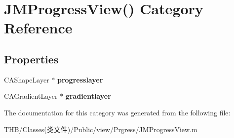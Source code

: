 \hypertarget{category_j_m_progress_view_07_08}{}\section{J\+M\+Progress\+View() Category Reference}
\label{category_j_m_progress_view_07_08}
\subsection*{Properties}
\begin{DoxyCompactItemize}
\item 
\mbox{\label{category_j_m_progress_view_07_08_ac23541a9fccaba55716b30b03fb4707a}} 
C\+A\+Shape\+Layer $\ast$ {\bfseries progresslayer}
\item 
\mbox{\label{category_j_m_progress_view_07_08_a1dac9503af405a5aa1bd5e360c5f707b}} 
C\+A\+Gradient\+Layer $\ast$ {\bfseries gradientlayer}
\end{DoxyCompactItemize}


The documentation for this category was generated from the following file\+:\begin{DoxyCompactItemize}
\item 
T\+H\+B/\+Classes(类文件)/\+Public/view/\+Prgress/J\+M\+Progress\+View.\+m\end{DoxyCompactItemize}
